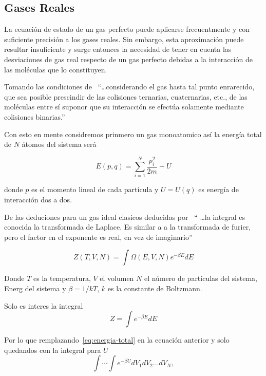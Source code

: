 \subsection{Gases Reales}
La ecuación de estado de un gas perfecto puede aplicarse
frecuentmente y con suficiente precisión a los gases reales. Sin embargo, esta aproximación
puede resultar insuficiente y surge entonces la necesidad de tener en cuenta las desviaciones de
gas real respecto de un gas perfecto debidas a la interacción de las moléculas que lo constituyen.
\parencite[p.~261]{landau}

Tomando las condiciones de~\parencite[p.~261]{landau} 
``\ldots considerando el gas hasta tal punto enrarecido, que sea posible prescindir de las colisiones ternarias, cuaternarias, etc.,
de las moléculas entre sí suponor que su interacción se efectúa solamente mediante colisiones binarias.''

Con esto en mente considremos prinmero un gas monoatomico así la energía total de $N$ átomos
del sistema será

\begin{equation}
    \label{eq:energia-total}
    E(p, q) = \sum_{i=1}^N \frac{p_i^2}{2m} + U
\end{equation}

donde $p$ es el momento lineal de cada partícula y $U = U(q)$ es energía
de interacción dos a dos.

De las deduciones para un gas ideal clasicos deducidas por~\parencite[p.~205, traducción propia]{Swendsen2012} ``
\ldots la integral es conocida la transformada de Laplace. Es similar a a la
transformada de furier, pero el factor en el exponente es real, en vez de imaginario''

\begin{equation}
    \label{eq:partition}
    Z(T, V, N) = \int \Omega(E, V, N) e^{-\beta E} dE
\end{equation}

Donde $T$ es la temperatura, $V$ el volumen $N$ el número de partículas del sistema, Energ	
del sistema y $\beta = 1/kT$, $k$ es la constante de Boltzmann.

Solo es interes la integral
\begin{equation}
    Z = \int e^{-\beta E} dE
\end{equation}

Por lo que remplazando~\ref{eq:energia-total} en la ecuación anterior y
solo quedandos con la integral para $U$
\begin{equation}
    \int \cdots \int e^{-\beta U} dV_1dV_2 \ldots dV_N,
\end{equation}


